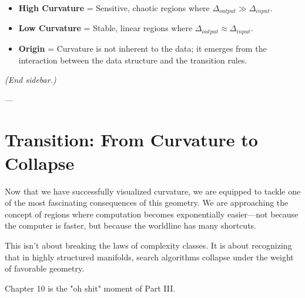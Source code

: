 \begin{itemize}
\item \textbf{High Curvature} = Sensitive, chaotic regions where $\Delta_{output} \gg \Delta_{input}$.
\item \textbf{Low Curvature} = Stable, linear regions where $\Delta_{output} \approx \Delta_{input}$.
\item \textbf{Origin} = Curvature is not inherent to the data; it emerges from the interaction between the data structure and the transition rules.
\end{itemize}

\textit{(End sidebar.)}

---

\section{\texorpdfstring{\textbf{Transition: From Curvature to Collapse}}{9.8 --- Transition: From Curvature to Collapse}}

Now that we have successfully visualized curvature, we are equipped to tackle one of the most fascinating consequences of this geometry. We are approaching the concept of regions where computation becomes exponentially easier—not because the computer is faster, but because the worldline has many shortcuts.

This isn't about breaking the laws of complexity classes. It is about recognizing that in highly structured manifolds, search algorithms collapse under the weight of favorable geometry.

Chapter 10 is the "oh shit" moment of Part III.
